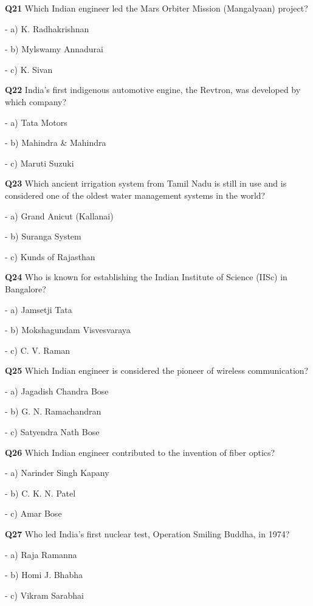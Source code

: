\textbf{Q21} Which Indian engineer led the Mars Orbiter Mission (Mangalyaan) project?\par
\quad - a) K. Radhakrishnan\par
\quad - b) Mylswamy Annadurai\par
\quad - c) K. Sivan\par

\textbf{Q22} India's first indigenous automotive engine, the Revtron, was developed by which company?\par
\quad - a) Tata Motors\par
\quad - b) Mahindra & Mahindra\par
\quad - c) Maruti Suzuki\par

\textbf{Q23} Which ancient irrigation system from Tamil Nadu is still in use and is considered one of the oldest water management systems in the world?\par
\quad - a) Grand Anicut (Kallanai)\par
\quad - b) Suranga System\par
\quad - c) Kunds of Rajasthan\par

\textbf{Q24} Who is known for establishing the Indian Institute of Science (IISc) in Bangalore?\par
\quad - a) Jamsetji Tata\par
\quad - b) Mokshagundam Visvesvaraya\par
\quad - c) C. V. Raman\par

\textbf{Q25} Which Indian engineer is considered the pioneer of wireless communication?\par
\quad - a) Jagadish Chandra Bose\par
\quad - b) G. N. Ramachandran\par
\quad - c) Satyendra Nath Bose\par

\textbf{Q26} Which Indian engineer contributed to the invention of fiber optics?\par
\quad - a) Narinder Singh Kapany\par
\quad - b) C. K. N. Patel\par
\quad - c) Amar Bose\par

\textbf{Q27} Who led India's first nuclear test, Operation Smiling Buddha, in 1974?\par
\quad - a) Raja Ramanna\par
\quad - b) Homi J. Bhabha\par
\quad - c) Vikram Sarabhai\par

